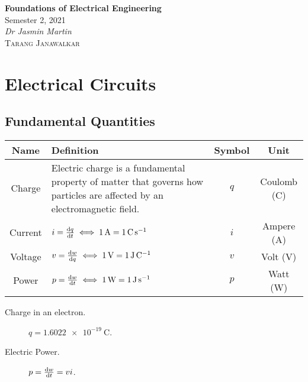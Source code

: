 \documentclass{article}
\date{}
\newcommand{\className}{Foundations of Electrical Engineering}
\newcommand{\classTime}{Semester 2, 2021}
\newcommand{\classInstructorName}{Dr Jasmin Martin}
\begin{document}
\begin{titlepage}
    \vspace*{\fill}
    \begin{center}
        \LARGE{\textbf{\className}}
        \texorpdfstring{\\}{ }
        \texorpdfstring{\vspace{0.1in}}{ }
        \normalsize{\classTime}
        \texorpdfstring{\\}{ }
        \texorpdfstring{\vspace{0.1in}}{ }
        \normalsize\textit{\classInstructorName}
        \texorpdfstring{\\}{ }
        \texorpdfstring{\vspace{0.2in}}{ }
        \textsc{Tarang Janawalkar}
    \end{center}
    \vspace*{\fill}
    \doclicenseThis
    \thispagestyle{empty}
\end{titlepage}
\newpage

\tableofcontents
\newpage

\section{Electrical Circuits}
\subsection{Fundamental Quantities}
\begingroup
\renewcommand{\arraystretch}{1.5}
\begin{table}[H]
    \centering
    \begin{tabular}{c | >{\centering}p{} | c c}
        \toprule
        \textbf{Name} & \textbf{Definition} & \textbf{Symbol} & \textbf{Unit} \\
        \midrule
        Charge & Electric charge is a fundamental property of matter that governs how particles are affected by an electromagnetic field.
        & $q$ & Coulomb (\unit{\coulomb}) \\
        \hline
        Current & $i=\dv{q}{t}\iff\SI{1}{\ampere}=\SI{1}{\coulomb\per\s}$
        & $i$ & Ampere (\unit{\ampere}) \\
        \hline
        Voltage & $v=\dv{w}{q}\iff\SI{1}{\volt}=\SI{1}{\joule\per\coulomb}$
        & $v$ & Volt (\unit{\volt}) \\
        \hline
        Power & $p=\dv{w}{t}\iff\SI{1}{\watt}=\SI{1}{\joule\per\s}$
        & $p$ & Watt (\unit{\watt}) \\
        \bottomrule
    \end{tabular}
\end{table}
\endgroup
\begin{description}
    \item[Charge in an electron.] $q=\SI{1.6022e-19}{\coulomb}$.
    \item[Electric Power.] $p=\dv{w}{t}=vi$. 
\end{description}
\end{document}
